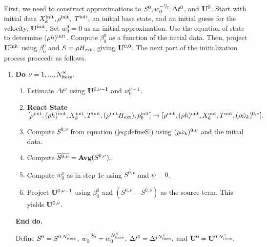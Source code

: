 First, we need to construct approximations to $S^0, w_0^{-\myhalf}, \Delta t^0$, 
and ${\bf U}^0$.  Start with initial data $X_k^{\mathrm{init}}, \rho^{\mathrm{init}},$ $T^{\mathrm{init}},$ an 
initial base state, and an initial guess for the velocity, ${\bf U}^{\mathrm{init}}$.
Set $w_0^0 = 0$ as an initial approximation.  Use the equation of state to 
determine $(\rho h)^{\mathrm{init}}$.  Compute $\beta_0^0$ as a function of 
the initial data.  Then, project ${\bf U}^{\mathrm{init}}$ using $\beta_0^0$ and 
$S = \rho{H_{\rm ext}}$, giving ${\bf U}^{0,0}$.  The next part of the initialization process 
proceeds as follows.

\begin{enumerate}
\renewcommand{\theenumi}{{\bf \alph{enumi}}}
\renewcommand{\labelenumii}{\roman{enumii}.}

\item {\bf Do} {$\nu = 1,...,N_{\rm iters}^{S}$.}
  \begin{enumerate}

  \item Estimate $\Delta t^\nu$ using ${\bf U}^{0,\nu-1}$ and $w_0^{\nu-1}.$

  \item {\bf React State}$[ \rho^{\mathrm{init}},(\rho h)^{\mathrm{init}}, X_k^{\mathrm{init}}, T^{\mathrm{init}}, 
(\rho^{\mathrm{init}} {H_{\rm ext}}), p_0^{\mathrm{init}}] \rightarrow [\rho^{\mathrm{out}}, (\rho h)^{\mathrm{out}}, 
X_k^{\mathrm{out}}, T^{\mathrm{out}}, (\rho \dot{\omega}_k)^{0,\nu} ].$

  \item Compute $S^{0,\nu}$ from equation (\ref{eq:defineS}) 
        using $(\rho \dot{\omega}_k)^{0,\nu}$ and the initial data.

  \item Compute $\overline{S^{0,\nu}} = {\mathrm{\bf Avg}} (S^{0,\nu}).$

  \item Compute $w_0^{\nu}$ as in step 1c using $\overline{S^{0,\nu}}$ and $\psi=0$.
        
  \item Project ${\bf U}^{0,\nu-1}$ using $\beta_0^0$ and 
        $(S^{0,\nu} - \overline{S^{0,\nu}})$ as the source term.  
        This yields ${\bf U}^{0,\nu}.$

  \end{enumerate}

  {\bf End do.}

  Define $S^0 = S^{0,N_{\rm iters}^S}$, $w_0^{-\myhalf} = w_0^{N_{\rm iters}^S}$, 
$\Delta t^0 = \Delta t^{N_{\rm iters}^S},$ and ${\bf U}^0 = {\bf U}^{0,N_{\rm iters}^S}.$

\end{enumerate}

